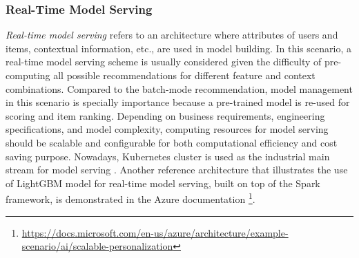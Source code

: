 \subsubsection{Real-Time Model Serving}
\textit{Real-time model serving} refers to an architecture where attributes of users and items, contextual information, etc., are used in model building. In this scenario, a real-time model serving scheme is usually considered given the difficulty of pre-computing all possible recommendations for different feature and context combinations. Compared to the batch-mode recommendation, model management in this scenario is specially importance because a pre-trained model is re-used for scoring and item ranking. Depending on business requirements, engineering specifications, and model complexity, computing resources for model serving should be scalable and configurable for both computational efficiency and cost saving purpose. Nowadays, Kubernetes cluster is used as the industrial main stream for model serving \cite{bernstein2014containers}. Another reference architecture that illustrates the use of LightGBM model \cite{ke2017lightgbm} for real-time model serving, built on top of the Spark framework, is demonstrated in the Azure documentation \footnote{\url{https://docs.microsoft.com/en-us/azure/architecture/example-scenario/ai/scalable-personalization}}.
